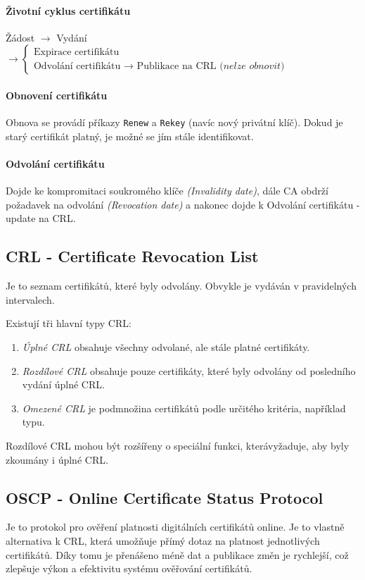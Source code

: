 \documentclass[10pt,a4paper]{article}
\begin{document}
\paragraph{Životní cyklus certifikátu}
Žádost $ \to $ Vydání $\to \begin{cases}
	\text{Expirace certifikátu}\\
	\text{Odvolání certifikátu } \to \text{ Publikace na CRL} \textit{ (nelze obnovit)}
\end{cases} $

\paragraph{Obnovení certifikátu}
Obnova se provádí příkazy \texttt{Renew} a \texttt{Rekey} (navíc nový privátní klíč).
Dokud je starý certifikát platný, je možné se jím stále identifikovat.

\paragraph{Odvolání certifikátu}
Dojde ke kompromitaci soukromého klíče \textit{(Invalidity date)}, dále CA obdrží požadavek na odvolání \textit{(Revocation date)} a nakonec dojde k Odvolání certifikátu - update na CRL.

\subsection{CRL - Certificate Revocation List}
Je to seznam certifikátů, které byly odvolány. 
Obvykle je vydáván v pravidelných intervalech. 

Existují tři hlavní typy CRL:
\begin{enumerate}\setlength\itemsep{0em}
	\item \textit{Úplné CRL} obsahuje všechny odvolané, ale stále platné certifikáty.
	\item \textit{Rozdílové CRL} obsahuje pouze certifikáty, které byly odvolány od posledního vydání úplné CRL.
	\item \textit{Omezené CRL} je podmnožina certifikátů podle určitého kritéria, například typu.
\end{enumerate}

Rozdílové CRL mohou být rozšířeny o speciální funkci, kterávyžaduje, aby byly zkoumány i úplné CRL.

\subsection{OSCP - Online Certificate Status Protocol}
Je to protokol pro ověření platnosti digitálních certifikátů online. 
Je to vlastně alternativa k CRL, která umožňuje přímý dotaz na platnost jednotlivých certifikátů. 
Díky tomu je přenášeno méně dat a publikace změn je rychlejší, což zlepšuje výkon a efektivitu systému ověřování certifikátů.
\end{document}
